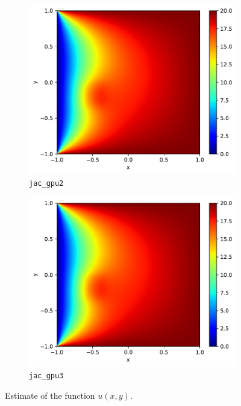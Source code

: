 \begin{figure}[!th]
\begin{subfigure}{.5\textwidth}
  \includegraphics[width=.9\linewidth]{data_3/pos/jac_gpu2.pdf}
  \caption{\texttt{jac\_gpu2}}
  \label{fig:jac_gpu2}
\end{subfigure}%
\begin{subfigure}{.5\textwidth}
  \centering
  \includegraphics[width=.9\linewidth]{data_3/pos/jac_gpu3.pdf}
  \caption{\texttt{jac\_gpu3}}
  \label{fig:jac_gpu3}
\end{subfigure}
\caption{Estimate of the function $u(x,y)$.}
\label{fig:apped_vis_pos}
\end{figure}